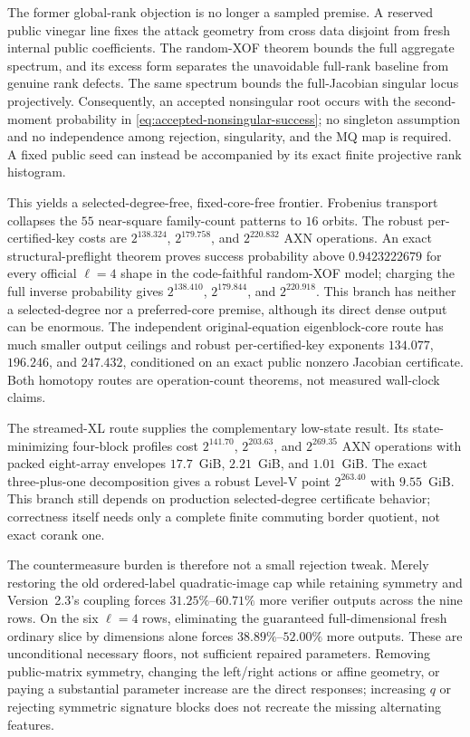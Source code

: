 \documentclass[11pt]{article}
\begin{document}
The former global-rank objection is no longer a sampled premise.  A reserved
public vinegar line fixes the attack geometry from cross data disjoint from
fresh internal public coefficients.  The random-XOF theorem bounds the full
aggregate spectrum, and its excess form separates the unavoidable
full-rank baseline from genuine rank defects.  The same spectrum bounds the
full-Jacobian singular locus projectively.  Consequently, an accepted
nonsingular root occurs with the second-moment probability in
\eqref{eq:accepted-nonsingular-success}; no singleton assumption and no
independence among rejection, singularity, and the MQ map is required.  A fixed
public seed can instead be accompanied by its exact finite projective rank
histogram.

This yields a selected-degree-free, fixed-core-free frontier.  Frobenius
transport collapses the $55$ near-square family-count patterns to $16$ orbits.
The robust per-certified-key costs are $2^{138.324}$, $2^{179.758}$, and
$2^{220.832}$ AXN operations.  An exact structural-preflight theorem proves
success probability above $0.9423222679$ for every official $\ell=4$ shape in
the code-faithful random-XOF model; charging the full inverse probability gives
$2^{138.410}$, $2^{179.844}$, and $2^{220.918}$.  This branch has neither a
selected-degree nor a preferred-core premise, although its direct dense output
can be enormous.  The independent original-equation eigenblock-core route has
much smaller output ceilings and robust per-certified-key exponents
$134.077$, $196.246$, and $247.432$, conditioned on an exact public nonzero
Jacobian certificate.  Both homotopy routes are operation-count theorems, not
measured wall-clock claims.

The streamed-XL route supplies the complementary low-state result.  Its
state-minimizing four-block profiles cost $2^{141.70}$, $2^{203.63}$, and
$2^{269.35}$ AXN operations with packed eight-array envelopes $17.7$~GiB,
$2.21$~GiB, and $1.01$~GiB.  The exact three-plus-one decomposition gives a
robust Level-V point $2^{263.40}$ with $9.55$~GiB.  This branch still depends
on production selected-degree certificate behavior; correctness itself needs
only a complete finite commuting border quotient, not exact corank one.

The countermeasure burden is therefore not a small rejection tweak.  Merely
restoring the old ordered-label quadratic-image cap while retaining symmetry
and Version~2.3's coupling forces $31.25\%$--$60.71\%$ more verifier outputs
across the nine rows.  On the six $\ell=4$ rows, eliminating the guaranteed
full-dimensional fresh ordinary slice by dimensions alone forces
$38.89\%$--$52.00\%$ more outputs.  These are unconditional necessary floors,
not sufficient repaired parameters.  Removing public-matrix symmetry,
changing the left/right actions or affine geometry, or paying a substantial
parameter increase are the direct responses; increasing $q$ or rejecting
symmetric signature blocks does not recreate the missing alternating
features.
\end{document}

